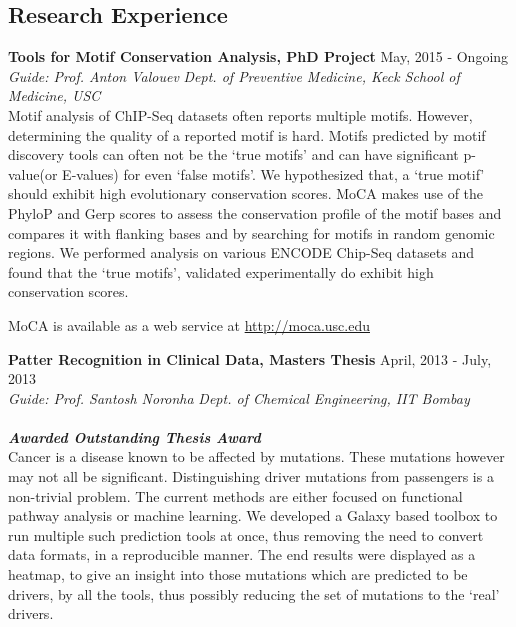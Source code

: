 \documentclass[margin,line]{res}
\begin{document}
\begin{resume}

\section{\sc Research Experience}

{\textbf{Tools for Motif Conservation Analysis, PhD Project}} \hfill {May, 2015 - Ongoing}\\
\textit{Guide: {Prof. Anton Valouev}} \hfill \textit{{Dept. of Preventive Medicine, Keck School of Medicine, USC}}\\

\noindent Motif analysis of ChIP-Seq datasets often reports multiple motifs. 
However, determining the quality of a reported motif is hard. Motifs predicted by motif discovery tools can often not be the `true motifs' and  
can have significant p-value(or E-values) for even `false motifs'.
We hypothesized that, a `true motif' should exhibit high evolutionary conservation scores.
MoCA makes use of the PhyloP and Gerp scores to assess the conservation profile of the motif bases and compares it with flanking bases and by 
searching for motifs in random genomic regions. 
We performed analysis on various ENCODE Chip-Seq datasets and found that the `true motifs', validated experimentally do exhibit high conservation scores.

MoCA is available as a web service at \url{http://moca.usc.edu}

\vspace{.3cm}
{\textbf{Patter Recognition in Clinical Data, Masters Thesis}} \hfill {April, 2013 - July, 2013}\\
\textit{Guide: {Prof. Santosh Noronha}} \hfill \textit{{Dept. of Chemical Engineering, IIT Bombay}}\\
\\
\textbf{\em{Awarded Outstanding Thesis Award}}\\

\noindent Cancer is a disease known to be affected by mutations. These mutations however may not all be significant.
Distinguishing driver mutations from passengers is a non-trivial problem. 
The current methods are either focused on functional pathway analysis or machine learning. 
We developed a Galaxy based toolbox to run multiple such prediction tools at once, thus removing the need to convert data formats, in a reproducible manner. 
The end results were displayed as a heatmap, to give an insight into those mutations which are predicted to be drivers, by all the tools, thus possibly reducing the set of mutations to the `real' drivers.


\end{resume}
\end{document}
